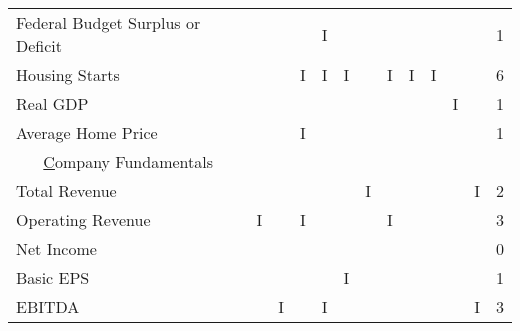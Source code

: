 \documentclass[12pt,a4paper,english]{article}
\begin{document}
\begin{table}[H]
\begin{minipage}{\textwidth}
{\begin{tabular}{@{}lrrrrrrrrrrr|r@{}}
				Federal Budget Surplus or   Deficit            &                                   &                               &                                 & I                                  &   &   &   &   &   &   &   & 1 \\
				Housing Starts                                 &                                   &                               & I                               & I                                  & I &   & I & I & I &   &   & 6 \\
				Real GDP                                       &                                   &                               &                                 &                                    &   &   &   &   &   & I &   & 1 \\
				Average Home Price                             &                                   &                               & I                               &                                    &   &   &   &   &   &   &   & 1 \\ \midrule
				\multicolumn{1}{c}{{\ul Company Fundamentals}} &                                   &                               &                                 &                                    &   &   &   &   &   &   &   &   \\
				Total Revenue                                  &                                   &                               &                                 &                                    &   & I &   &   &   &   & I & 2 \\
				Operating Revenue                              & I                                 &                               & I                               &                                    &   &   & I &   &   &   &   & 3 \\
				Net Income                                     &                                   &                               &                                 &                                    &   &   &   &   &   &   &   & 0 \\
				Basic EPS                                      &                                   &                               &                                 &                                    & I &   &   &   &   &   &   & 1 \\
				EBITDA                                         &                                   & I                             &                                 & I                                  &   &   &   &   &   &   & I & 3 \\

\end{tabular}}
\end{minipage}
\end{table}
\end{document}

